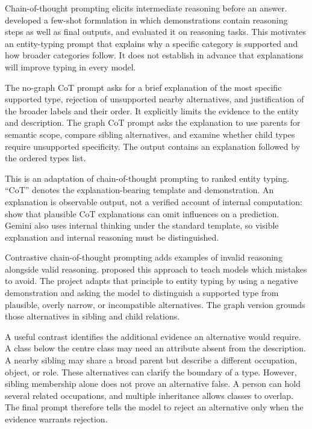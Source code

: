 Chain-of-thought prompting elicits intermediate reasoning before an answer. \citet{wei2022} developed a few-shot formulation in which demonstrations contain reasoning steps as well as final outputs, and evaluated it on reasoning tasks. This motivates an entity-typing prompt that explains why a specific category is supported and how broader categories follow. It does not establish in advance that explanations will improve typing in every model.


The no-graph CoT prompt asks for a brief explanation of the most specific supported type, rejection of unsupported nearby alternatives, and justification of the broader labels and their order. It explicitly limits the evidence to the entity and description. The graph CoT prompt asks the explanation to use parents for semantic scope, compare sibling alternatives, and examine whether child types require unsupported specificity. The output contains an explanation followed by the ordered types list.


This is an adaptation of chain-of-thought prompting to ranked entity typing. “CoT” denotes the explanation-bearing template and demonstration. An explanation is observable output, not a verified account of internal computation: \citet{turpin2023} show that plausible CoT explanations can omit influences on a prediction. Gemini also uses internal thinking under the standard template, so visible explanation and internal reasoning must be distinguished.


Contrastive chain-of-thought prompting adds examples of invalid reasoning alongside valid reasoning. \citet{chia2023} proposed this approach to teach models which mistakes to avoid. The project adapts that principle to entity typing by using a negative demonstration and asking the model to distinguish a supported type from plausible, overly narrow, or incompatible alternatives. The graph version grounds those alternatives in sibling and child relations.


A useful contrast identifies the additional evidence an alternative would require. A class below the centre class may need an attribute absent from the description. A nearby sibling may share a broad parent but describe a different occupation, object, or role. These alternatives can clarify the boundary of a type. However, sibling membership alone does not prove an alternative false. A person can hold several related occupations, and multiple inheritance allows classes to overlap. The final prompt therefore tells the model to reject an alternative only when the evidence warrants rejection.


